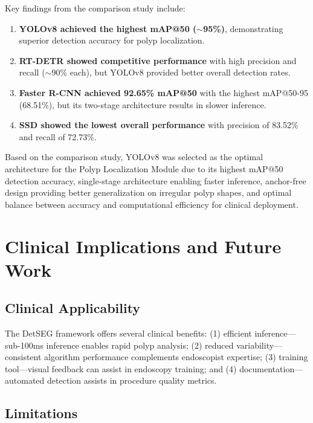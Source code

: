 \documentclass[conference]{IEEEtran}
\begin{document}
Key findings from the comparison study include:

\begin{enumerate}
    \item \textbf{YOLOv8 achieved the highest mAP@50 ($\sim$95\%)}, demonstrating superior detection accuracy for polyp localization.
    \item \textbf{RT-DETR showed competitive performance} with high precision and recall ($\sim$90\% each), but YOLOv8 provided better overall detection rates.
    \item \textbf{Faster R-CNN achieved 92.65\% mAP@50} with the highest mAP@50-95 (68.51\%), but its two-stage architecture results in slower inference.
    \item \textbf{SSD showed the lowest overall performance} with precision of 83.52\% and recall of 72.73\%.
\end{enumerate}

Based on the comparison study, YOLOv8 was selected as the optimal architecture for the Polyp Localization Module due to its highest mAP@50 detection accuracy, single-stage architecture enabling faster inference, anchor-free design providing better generalization on irregular polyp shapes, and optimal balance between accuracy and computational efficiency for clinical deployment.

\section{Clinical Implications and Future Work}

\subsection{Clinical Applicability}

The DetSEG framework offers several clinical benefits: (1) efficient inference---sub-100ms inference enables rapid polyp analysis; (2) reduced variability---consistent algorithm performance complements endoscopist expertise; (3) training tool---visual feedback can assist in endoscopy training; and (4) documentation---automated detection assists in procedure quality metrics.

\subsection{Limitations}
\end{document}
